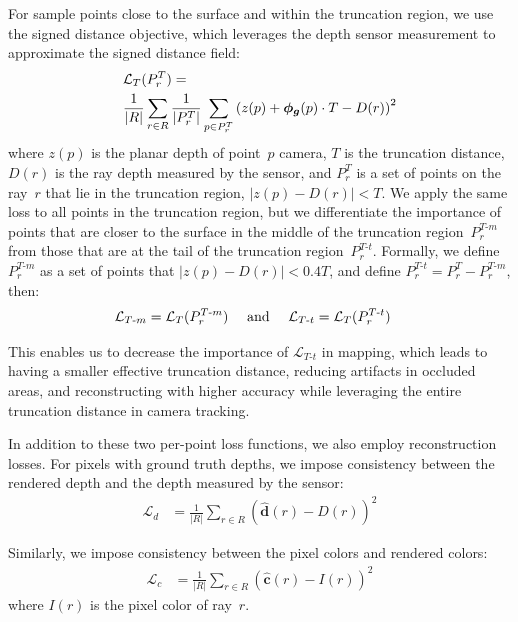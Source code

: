 For sample points close to the surface and within the truncation region, we use the signed distance objective, which leverages the depth sensor measurement to approximate the signed distance field:
\begin{align}
    &\mathcal{L}_{T}(P_{r}^{T}) = \notag \\
    &\frac{1}{|R|} \sum_{r \in R} \frac{1}{|P_{r}^{T}|} \sum_{p \in P_{r}^{T}} \left( z(p) + \boldsymbol{\phi_{g}}(p) \cdot T - D(r) \right)^2
\end{align}
where $z(p)$ is the planar depth of point~$p$ \wrt camera, $T$ is the truncation distance, $D(r)$ is the ray depth measured by the sensor, and $P_{r}^{T}$ is a set of points on the ray~$r$ that lie in the truncation region, \ie $|z(p) - D(r)| < T$. We apply the same loss to all points in the truncation region, but we differentiate the importance of points that are closer to the surface in the middle of the truncation region~$P_{r}^{T\text{-}m}$ from those that are at the tail of the truncation region~$P_{r}^{T\text{-}t}$. Formally, we define $P_{r}^{T\text{-}m}$ as a set of points that $|z(p) - D(r)| < 0.4T$, and define $P_{r}^{T\text{-}t} = P_{r}^{T} - P_{r}^{T\text{-}m}$, then:
\begin{align}
	\mathcal{L}_{T\text{-}m} &= \mathcal{L}_{T}(P_{r}^{T\text{-}m}) \text{\phantom{00} and \phantom{00}} \mathcal{L}_{T\text{-}t} = \mathcal{L}_{T}(P_{r}^{T\text{-}t})
\end{align}

This enables us to decrease the importance of $\mathcal{L}_{T\text{-}t}$ in mapping, which leads to having a smaller effective truncation distance, reducing artifacts in occluded areas, and reconstructing with higher accuracy while leveraging the entire truncation distance in camera tracking. 

In addition to these two per-point loss functions, we also employ reconstruction losses. For pixels with ground truth depths, we impose consistency between the rendered depth and the depth measured by the sensor:
\begin{align}
	\mathcal{L}_{d} &= \frac{1}{|R|} \sum_{r \in R} \left( \boldsymbol{\hat{d}}(r) - D(r) \right)^2
\end{align}

Similarly, we impose consistency between the pixel colors and rendered colors:
\begin{align}
	\mathcal{L}_{c} &= \frac{1}{|R|} \sum_{r \in R} \left( \boldsymbol{\hat{c}}(r) - I(r) \right)^2
\end{align}
where $I(r)$ is the pixel color of ray~$r$.

